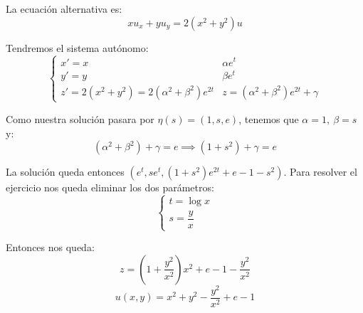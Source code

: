 \documentclass[openany]{book}
\begin{document}
\setcounter{ex}{5}
\begin{exercise}
  $  $\\ 
  La ecuación alternativa es:
  $$ xu_{x}+yu_{y} = 2(x^2+y^2)u $$

  Tendremos el sistema autónomo:
  $$ \left\{
  \begin{array}{ll}
    x' = x & \alpha e^{t}\\ 
    y' = y & \beta e^{t}\\ 
    z' = 2(x^2+y^2) = 2(\alpha^2+\beta ^2)e^{2t} & z = (\alpha^2+\beta^2)e^{2t}+ \gamma 
  \end{array}
  \right. $$

  Como nuestra solución pasara por $ \eta(s) = (1,s,e) $, tenemos que $ \alpha = 1,\ \beta = s $ y:
  $$ (\alpha^2+\beta^2) + \gamma = e \implies (1+s^2)+ \gamma = e $$
  
  La solución queda entonces $ (e^{t},se^{t},(1+s^2)e^{2t}+e-1-s^2) $. Para resolver el ejercicio nos queda eliminar los dos parámetros:
  $$ \left\{
  \begin{array}{l}
    t = \log{x}\\ 
    s = \dfrac{y}{x}
  \end{array}
  \right. $$

  Entonces nos queda:
  $$ z = \left(1+\dfrac{y^2}{x^2}\right)x^2+e-1-\dfrac{y^2}{x^2} $$
  $$ u(x,y) = x^2+y^2-\dfrac{y^2}{x^2}+e-1 $$
\end{exercise}





\end{document}
